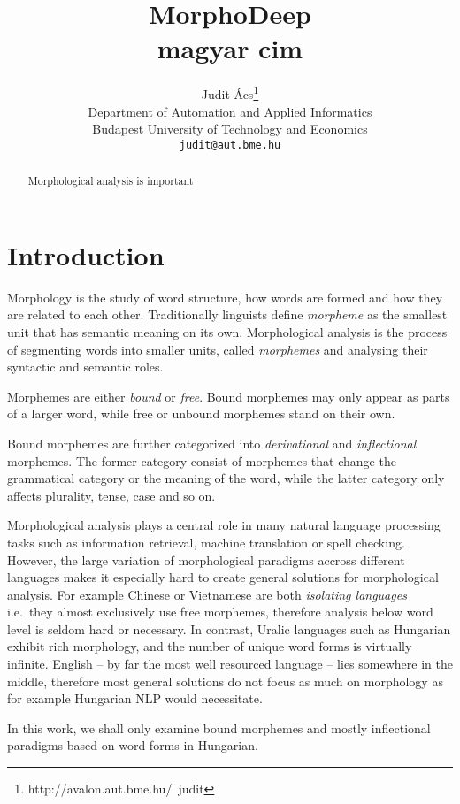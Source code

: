 \documentclass{article}
\title{MorphoDeep\\ magyar cim}
\author{
  Judit \'Acs\thanks{http://avalon.aut.bme.hu/~judit} \\
  Department of Automation and Applied Informatics \\
  Budapest University of Technology and Economics\\
  \texttt{judit@aut.bme.hu} \\
}
\begin{document}
\maketitle

\begin{abstract}
Morphological analysis is important
\end{abstract}

\section{Introduction}\label{sec:introduction}

Morphology is the study of word structure, how words are formed and how they are related to each other.
Traditionally linguists define \emph{morpheme} as the smallest unit that has semantic meaning on its own.
Morphological analysis is the process of segmenting words into smaller units, called \emph{morphemes} and analysing their syntactic and semantic roles.

Morphemes are either \emph{bound} or \emph{free}.
Bound morphemes may only appear as parts of a larger word, while free or unbound morphemes stand on their own.

Bound morphemes are further categorized into \emph{derivational} and \emph{inflectional} morphemes.
The former category consist of morphemes that change the grammatical category or the meaning of the word, while the latter category only affects plurality, tense, case and so on.

Morphological analysis plays a central role in many natural language processing tasks such as information retrieval, machine translation or spell checking.
However, the large variation of morphological paradigms accross different languages makes it especially hard to create general solutions for morphological analysis.
For example Chinese or Vietnamese are both \emph{isolating languages} i.e.~they almost exclusively use free morphemes, therefore analysis below word level is seldom hard or necessary.
In contrast, Uralic languages such as Hungarian exhibit rich morphology, and the number of unique word forms is virtually infinite.
English -- by far the most well resourced language -- lies somewhere in the middle, therefore most general solutions do not focus as much on morphology as for example Hungarian NLP would necessitate.

In this work, we shall only examine bound morphemes and mostly inflectional paradigms based on word forms in Hungarian.
\end{document}
